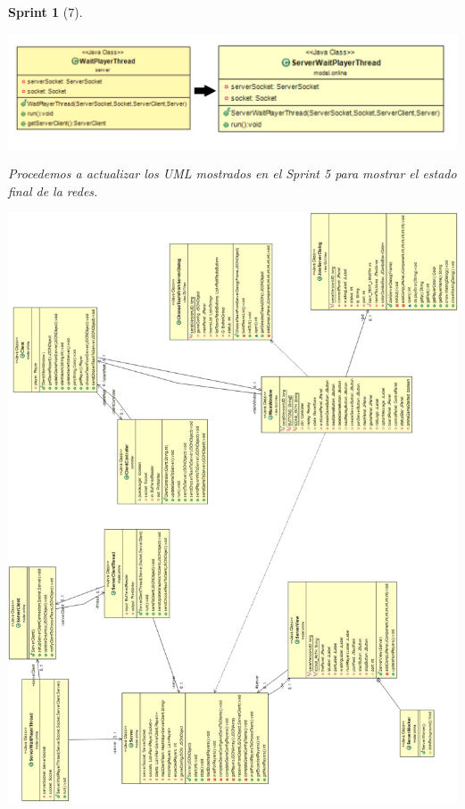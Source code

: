 \documentclass{article}
\theoremstyle{break}
\newtheorem*{sprint}{Sprint}
\begin{document}
\begin{sprint}[7]
\begin{center}
\includegraphics[scale=0.3]{WaitPlayerThread-evol.png} 
\end{center}

Procedemos a actualizar los UML mostrados en el Sprint 5 para mostrar el estado final de la redes.

\begin{center}
\includegraphics[scale=0.45]{UMLClasesRedSprint7.png} 
\end{center}


\end{sprint}
\end{document}
